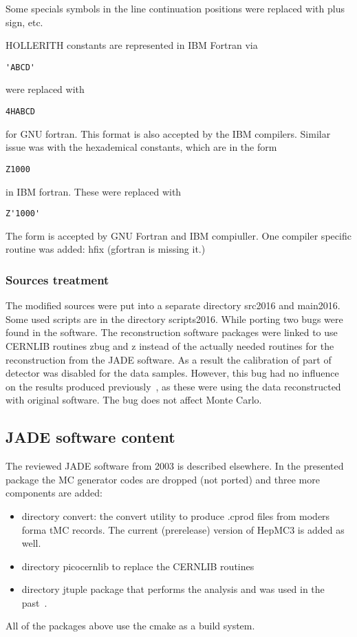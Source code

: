Some specials symbols in the line continuation positions  were replaced with plus sign, etc.

HOLLERITH constants are represented in IBM Fortran via
\begin{verbatim}
'ABCD'
\end{verbatim}
were replaced with
\begin{verbatim}
4HABCD
\end{verbatim}
for GNU fortran. This format is also accepted by the IBM compilers.
Similar issue was with the hexademical constants, which are in the form 
\begin{verbatim}
Z1000
\end{verbatim}
in IBM fortran. These were replaced with 
\begin{verbatim}
Z'1000'
\end{verbatim}
The form is accepted by GNU Fortran and IBM compiuller.
One compiler specific routine was added: hfix (gfortran is missing it.)

\subsubsection{Sources treatment}
The modified  sources were put into a separate directory src2016 and main2016.
Some used scripts are in the directory scripts2016.
 While porting two bugs were found in the software.
 The reconstruction software packages were linked to use CERNLIB routines zbug and z  instead of the actually needed routines for the reconstruction
 from the JADE software. As a result the calibration of part of detector was disabled for the data samples.
 However, this bug had no influence on the results produced previously~\cite{Schieck:2012mp}, as these were using the 
 data reconstructed with original software. The bug does not affect Monte Carlo.

\subsection{JADE software content}
The reviewed JADE software from 2003 is described elsewhere.
In the presented package the MC generator codes are dropped (not ported) and 
three more components are added:
\begin{itemize}
\item directory convert: the convert utility to produce .cprod files from moders forma tMC records. The current (prerelease) version of HepMC3 is added as well.
\item directory picocernlib to replace the CERNLIB routines
\item directory jtuple package that performs the analysis and was used in the past~\cite{Schieck:2012mp}. 
\end{itemize} 
All of the packages above use the cmake as a build system.

